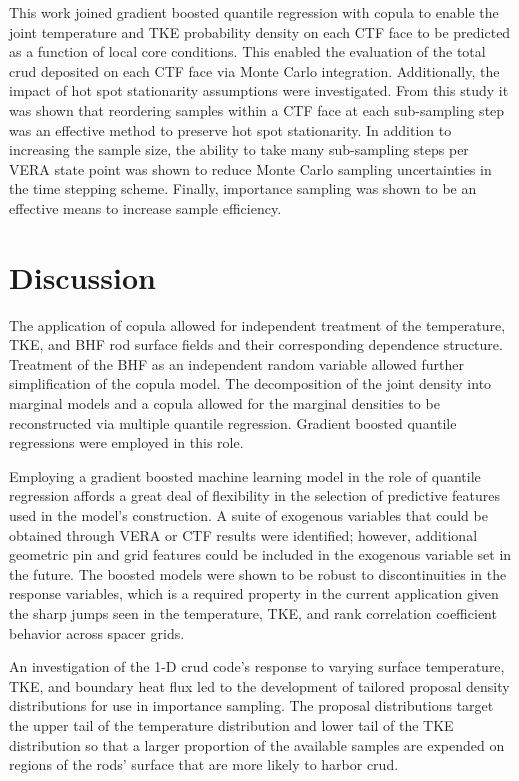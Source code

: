 
This work joined gradient boosted quantile regression with copula to enable the joint temperature and TKE probability density on each CTF face to be predicted as a function of local core conditions.  This enabled the evaluation of the total crud deposited on each CTF face via Monte Carlo integration.  Additionally, the impact of hot spot stationarity assumptions were investigated.  From this study it was shown that reordering samples within a CTF face at each sub-sampling step was an effective method to preserve hot spot stationarity.  In addition to increasing the sample size, the ability to take many sub-sampling steps per VERA state point was shown to reduce Monte Carlo sampling uncertainties in the time stepping scheme.  Finally, importance sampling was shown to be an effective means to increase sample efficiency.

\section{Discussion}

The application of copula allowed for independent treatment of the temperature, TKE, and BHF rod surface fields and their corresponding dependence structure.  Treatment of the BHF as an independent random variable allowed further simplification of the copula model.  The decomposition of the joint density into marginal models and a copula allowed for the marginal densities to be reconstructed via multiple quantile regression.  Gradient boosted quantile regressions were employed in this role.

Employing a gradient boosted machine learning model in the role of quantile regression affords a great deal of flexibility in the selection of predictive features used in the model's construction.  A suite of exogenous variables that could be obtained through VERA or CTF results were identified; however,  additional geometric pin and grid features could be included in the exogenous variable set in the future.  The boosted models were shown to be robust to discontinuities in the response variables, which is a required property in the current application given the sharp jumps seen in the temperature, TKE, and rank correlation coefficient behavior across spacer grids.

An investigation of the 1-D crud code's response to varying surface temperature, TKE, and boundary heat flux led to the development of tailored proposal density distributions for use in importance sampling.   The proposal distributions target the upper tail of the temperature distribution and lower tail of the TKE distribution so that a larger proportion of the available samples are expended on regions of the rods' surface that are more likely to harbor crud.

